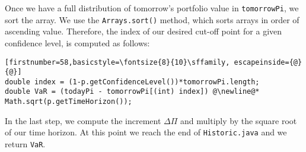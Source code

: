 \documentclass[../Dissertation.tex]{subfiles}
\begin{document}
Once we have a full distribution of tomorrow's portfolio value in \lstinline|tomorrowPi|, we sort the array.
We use the \lstinline|Arrays.sort()| method, which sorts arrays in order of ascending value.
Therefore, the index of our desired cut-off point for a given confidence level, is computed as follows:
\begin{lstlisting}[firstnumber=58,basicstyle=\fontsize{8}{10}\sffamily, escapeinside={@}{@}]
double index = (1-p.getConfidenceLevel())*tomorrowPi.length;
double VaR = (todayPi - tomorrowPi[(int) index]) @\newline@* Math.sqrt(p.getTimeHorizon());
\end{lstlisting}
In the last step, we compute the increment $\Delta\Pi$ and multiply by the square root of our time horizon.
At this point we reach the end of \lstinline|Historic.java| and we return \lstinline|VaR|.
\fi
\end{document}
